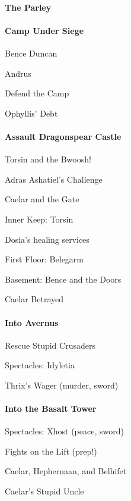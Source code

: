 \documentclass[10pt,a4,twoside]{book}
\begin{document}
\begin{multicols}{3}
\paragraph*{The Parley}
\paragraph*{Camp Under Siege}
\begin{trivlist}
\item Bence Duncan
\item Andrus
\item Defend the Camp %
\item Ophyllis' Debt 
\end{trivlist}

\paragraph*{Assault Dragonspear Castle}
\begin{trivlist}
\item Torsin and the Bwoosh!
\item Adras Ashatiel's Challenge
\item Caelar and the Gate
\item Inner Keep: Torsin
\item Dosia's healing services
\item First Floor: Belegarm
\item Basement: Bence and the Doors
\item Caelar Betrayed
\end{trivlist}
\paragraph*{Into Avernus}
\begin{trivlist}
\item Rescue Stupid Crusaders
\item Spectacles: Idyletia
\item Thrix's Wager (murder, sword)
\end{trivlist}


\paragraph*{Into the Basalt Tower}
\begin{trivlist}
\item Spectacles: Xhost (peace, sword)
\item Fights on the Lift (prep!)
\item Caelar, Hephernaan, and Belhifet
\item Caelar's Stupid Uncle
\end{trivlist}


\end{multicols}
\end{document}

